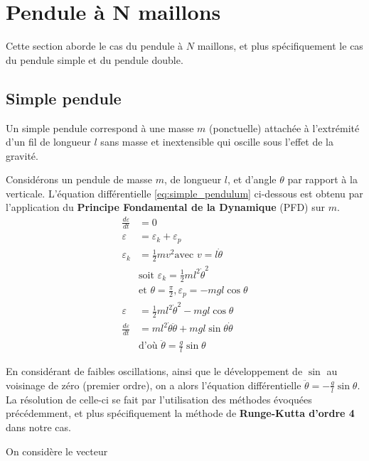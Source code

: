 \section{Pendule à N maillons}

Cette section aborde le cas du pendule à $N$ maillons, et plus spécifiquement le cas du pendule simple et du pendule double.

\subsection{Simple pendule}

Un simple pendule correspond à une masse $m$ (ponctuelle) attachée à l'extrémité d'un fil de longueur $l$ sans masse et inextensible qui oscille sous l'effet de la gravité.

Considérons un pendule de masse $m$, de longueur $l$, et d'angle $\theta$ par rapport à la verticale. L'équation différentielle \ref{eq:simple_pendulum} ci-dessous est obtenu par l'application du \textbf{Principe Fondamental de la Dynamique} (PFD) sur $m$.
\begin{align}
    \frac{d\varepsilon}{dt} &= 0 \\
    \varepsilon &= \varepsilon_k + \varepsilon_p \\
    \varepsilon_k &= \frac{1}{2}mv^2 \text{avec $v = l\dot{\theta}$} \\
    &\text{soit $\varepsilon_k = \frac{1}{2}ml^2\dot{\theta}^2$} \\
    &\text{et $\theta = \frac{\pi}{2}, \varepsilon_p = -mgl \cos{\theta}$} \\
    \varepsilon &= \frac{1}{2}ml^2\dot{\theta}^2 - mgl\cos{\theta} \\
    \frac{d\varepsilon}{dt} &= ml^2\dot{\theta}\ddot{\theta} + mgl \sin{\theta\dot{\theta}} \\
    &\text{d'où $\boxed{\ddot{\theta} = \frac{g}{l}\sin{\theta}}$}
    \label{eq:simple_pendulum}
\end{align}

En considérant de faibles oscillations, ainsi que le développement de $\sin$ au voisinage de zéro (premier ordre), on a alors l'équation différentielle $\ddot{\theta} = -\frac{g}{l}\sin{\theta}$. La résolution de celle-ci se fait par l'utilisation des méthodes évoquées précédemment, et plus spécifiquement la méthode de \textbf{Runge-Kutta d'ordre 4} dans notre cas.

On considère le vecteur 
\vspace{4.00mm}

